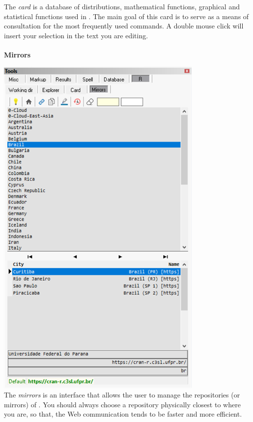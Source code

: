 The \textit{card} is a database of distributions, mathematical functions, graphical and statistical functions used in \RR{}.
The main goal of this card is to serve as a means of consultation for the most frequently used commands.
A double mouse click will insert your selection in the text you are editing.

\newpage
\paragraph{}\textbf{Mirrors}\\

\includegraphics[scale=0.8]{./res/tools_r_mirrors.png} \\

The \textit{mirrors} is an interface that allows the user to manage the repositories (or mirrors) of \RR{}.
You should always choose a repository physically closest to where you are,
so that, the Web communication tends to be faster and more efficient.


